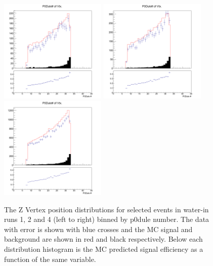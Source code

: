\begin{figure}[h]
\centering
\includegraphics[width=2in]{Figures/TN100Plots/c_Layerwater_1.png}
\includegraphics[width=2in]{Figures/TN100Plots/c_Layerwater_2.png}
\includegraphics[width=2in]{Figures/TN100Plots/c_Layerwater_4.png}
\caption{The Z Vertex position distributions for selected events in water-in runs 1, 2 and 4 (left to right) binned by p0dule number. The data with error is shown with blue crosses and the MC signal and background are shown in red and black respectively. Below each distribution histogram is the MC predicted signal efficiency as a function of the same variable.}
\label{fig:xsZw}
\end{figure}

